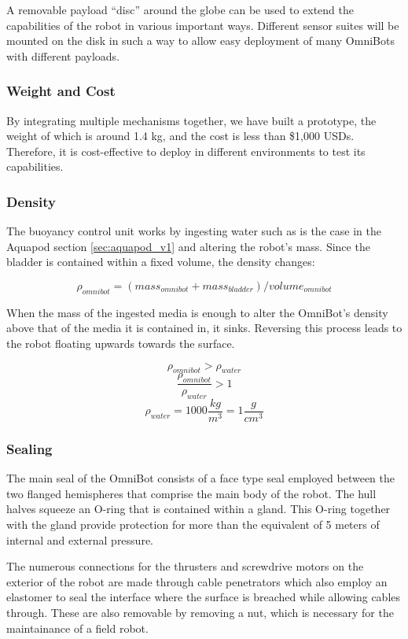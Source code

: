 A removable payload “disc” around the globe can be used to extend the capabilities of the robot in various important ways. Different sensor suites will be mounted on the disk in such a way to allow easy deployment of many OmniBots with different payloads.

\subsubsection{Weight and Cost}

By integrating multiple mechanisms together, we have built a prototype, the weight of which is around 1.4 kg, and the cost is less than \$1,000 USDs. Therefore, it is cost-effective to deploy in different environments to test its capabilities.

\subsubsection{Density}

The buoyancy control unit works by ingesting water such as is the case in the Aquapod section \ref{sec:aquapod_v1} and altering the robot's mass. Since the bladder is contained within a fixed volume, the density changes:

$$ \rho_{omnibot} = (mass_{omnibot}+mass_{bladder})/volume_{omnibot} $$ 

When the mass of the ingested media is enough to alter the OmniBot's density above that of the media it is contained in, it sinks. Reversing this process leads to the robot floating upwards towards the surface. 

$$ \rho_{omnibot} > \rho_{water} $$
$$ \frac{\rho_{omnibot}}{\rho_{water} } > 1 $$
$$ \rho_{water} = 1000 \frac{kg}{m^3} = 1 \frac{g}{cm^3} $$ 

\subsubsection{Sealing}
The main seal of the OmniBot consists of a face type seal employed between the two flanged hemispheres that comprise the main body of the robot. The hull halves squeeze an O-ring that is contained within a gland. This O-ring together with the gland provide protection for more than the equivalent of 5 meters of internal and external pressure. 

The numerous connections for the thrusters and screwdrive motors on the exterior of the robot are made through cable penetrators which also employ an elastomer to seal the interface where the surface is breached while allowing cables through. These are also removable by removing a nut, which is necessary for the maintainance of a field robot. 

